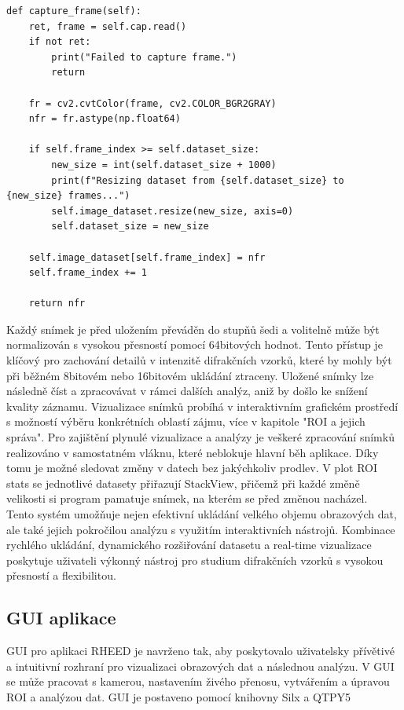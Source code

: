 \documentclass[a4paper,11pt]{article}
\begin{document}
\begin{lstlisting}
def capture_frame(self):
    ret, frame = self.cap.read()
    if not ret:
        print("Failed to capture frame.")
        return

    fr = cv2.cvtColor(frame, cv2.COLOR_BGR2GRAY)
    nfr = fr.astype(np.float64)

    if self.frame_index >= self.dataset_size:
        new_size = int(self.dataset_size + 1000)
        print(f"Resizing dataset from {self.dataset_size} to {new_size} frames...")
        self.image_dataset.resize(new_size, axis=0)
        self.dataset_size = new_size  

    self.image_dataset[self.frame_index] = nfr
    self.frame_index += 1

    return nfr
\end{lstlisting}
\vspace{0.5cm}

Každý snímek je před uložením převáděn do stupňů šedi a volitelně může být normalizován s vysokou přesností pomocí 64bitových hodnot. Tento přístup je klíčový pro zachování detailů v intenzitě difrakčních vzorků, které by mohly být při běžném 8bitovém nebo 16bitovém ukládání ztraceny. Uložené snímky lze následně číst a zpracovávat v rámci dalších analýz, aniž by došlo ke snížení kvality záznamu. Vizualizace snímků probíhá v interaktivním grafickém prostředí s možností výběru konkrétních oblastí zájmu, více v kapitole "ROI a jejich správa". Pro zajištění plynulé vizualizace a analýzy je veškeré zpracování snímků realizováno v samostatném vláknu, které neblokuje hlavní běh aplikace. Díky tomu je možné sledovat změny v datech bez jakýchkoliv prodlev. V plot ROI stats se jednotlivé datasety přiřazují StackView, přičemž při každé změně velikosti si program pamatuje snímek, na kterém se před změnou nacházel.\\

Tento systém umožňuje nejen efektivní ukládání velkého objemu obrazových dat, ale také jejich pokročilou analýzu s využitím interaktivních nástrojů. Kombinace rychlého ukládání, dynamického rozšiřování datasetu a real-time vizualizace poskytuje uživateli výkonný nástroj pro studium difrakčních vzorků s vysokou přesností a flexibilitou.\\

\newpage

\subsection{GUI aplikace}
GUI pro aplikaci RHEED je navrženo tak, aby poskytovalo uživatelsky přívětivé a intuitivní rozhraní pro vizualizaci obrazových dat a následnou analýzu. V GUI se může pracovat s kamerou, nastavením živého přenosu, vytvářením a úpravou ROI a analýzou dat. GUI je postaveno pomocí knihovny Silx a QTPY5
\end{document}
